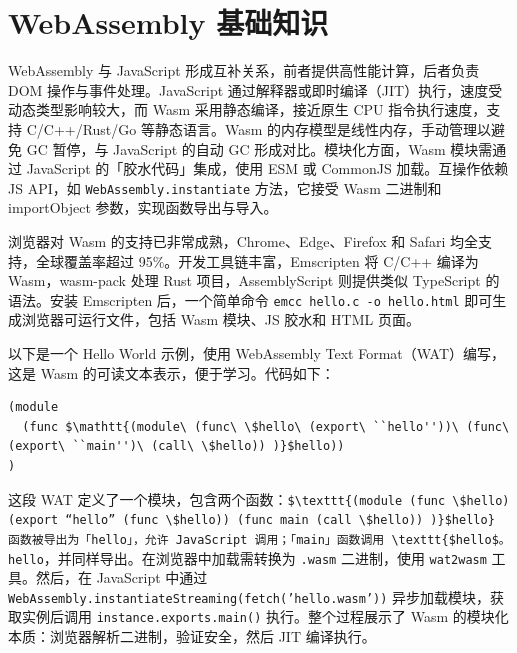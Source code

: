 \chapter{WebAssembly 基础知识}
WebAssembly 与 JavaScript 形成互补关系，前者提供高性能计算，后者负责 DOM 操作与事件处理。JavaScript 通过解释器或即时编译（JIT）执行，速度受动态类型影响较大，而 Wasm 采用静态编译，接近原生 CPU 指令执行速度，支持 C/C++/Rust/Go 等静态语言。Wasm 的内存模型是线性内存，手动管理以避免 GC 暂停，与 JavaScript 的自动 GC 形成对比。模块化方面，Wasm 模块需通过 JavaScript 的「胶水代码」集成，使用 ESM 或 CommonJS 加载。互操作依赖 JS API，如 \texttt{WebAssembly.instantiate} 方法，它接受 Wasm 二进制和 importObject 参数，实现函数导出与导入。\par
浏览器对 Wasm 的支持已非常成熟，Chrome、Edge、Firefox 和 Safari 均全支持，全球覆盖率超过 95\%{}。开发工具链丰富，Emscripten 将 C/C++ 编译为 Wasm，wasm-pack 处理 Rust 项目，AssemblyScript 则提供类似 TypeScript 的语法。安装 Emscripten 后，一个简单命令 \texttt{emcc hello.c -o hello.html} 即可生成浏览器可运行文件，包括 Wasm 模块、JS 胶水和 HTML 页面。\par
以下是一个 Hello World 示例，使用 WebAssembly Text Format（WAT）编写，这是 Wasm 的可读文本表示，便于学习。代码如下：\par
\begin{lstlisting}
(module
  (func $\mathtt{(module\ (func\ \$hello\ (export\ ``hello''))\ (func\ (export\ ``main'')\ (call\ \$hello)) )}$hello))
)
\end{lstlisting}
这段 WAT 定义了一个模块，包含两个函数：\texttt{\${}\textbackslash{}texttt\{{}(module (func \textbackslash{}\${}hello) (export ``hello'' (func \textbackslash{}\${}hello)) (func main (call \textbackslash{}\${}hello)) )\}{}\${}hello\}{} 函数被导出为「hello」，允许 JavaScript 调用；「main」函数调用 \textbackslash{}texttt\{{}\${}hello\${}。hello}，并同样导出。在浏览器中加载需转换为 \texttt{.wasm} 二进制，使用 \texttt{wat2wasm} 工具。然后，在 JavaScript 中通过 \texttt{WebAssembly.instantiateStreaming(fetch('hello.wasm'))} 异步加载模块，获取实例后调用 \texttt{instance.exports.main()} 执行。整个过程展示了 Wasm 的模块化本质：浏览器解析二进制，验证安全，然后 JIT 编译执行。\par
